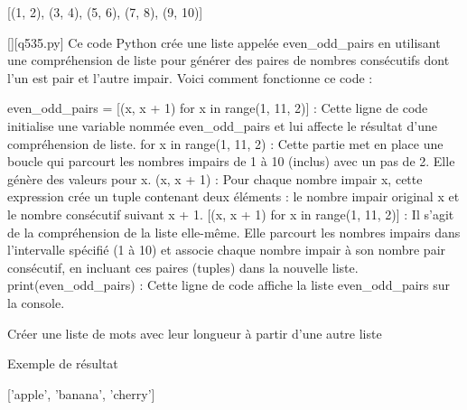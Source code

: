 [(1, 2), (3, 4), (5, 6), (7, 8), (9, 10)]
        \par
        \begin{solution}
            \renewcommand{\nomfichier}{q535.py}
            \pythonfile{\chemincode \nomfichier}[][\nomfichier]
            Ce code Python crée une liste appelée even\_odd\_pairs en utilisant une compréhension de liste pour générer des paires de nombres consécutifs dont l'un est pair et l'autre impair. Voici comment fonctionne ce code :

    even\_odd\_pairs = [(x, x + 1) for x in range(1, 11, 2)] : Cette ligne de code initialise une variable nommée even\_odd\_pairs et lui affecte le résultat d'une compréhension de liste.
        for x in range(1, 11, 2) : Cette partie met en place une boucle qui parcourt les nombres impairs de 1 à 10 (inclus) avec un pas de 2. Elle génère des valeurs pour x.
        (x, x + 1) : Pour chaque nombre impair x, cette expression crée un tuple contenant deux éléments : le nombre impair original x et le nombre consécutif suivant x + 1.
        [(x, x + 1) for x in range(1, 11, 2)] : Il s'agit de la compréhension de la liste elle-même. Elle parcourt les nombres impairs dans l'intervalle spécifié (1 à 10) et associe chaque nombre impair à son nombre pair consécutif, en incluant ces paires (tuples) dans la nouvelle liste.
    print(even\_odd\_pairs) : Cette ligne de code affiche la liste even\_odd\_pairs sur la console.
        \end{solution}
        

        \question
        Créer une liste de mots avec leur longueur à partir d'une autre liste

Exemple de résultat

['apple', 'banana', 'cherry']

